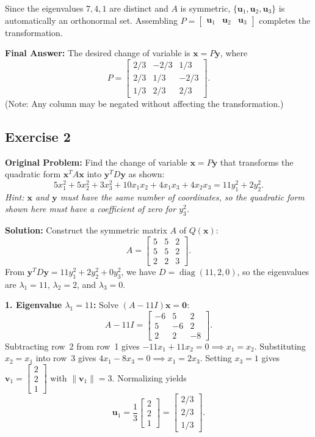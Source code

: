 \documentclass[11pt, letterpaper]{article}
\theoremstyle{definition}
\theoremstyle{remark}
\begin{document}
Since the eigenvalues $7, 4, 1$ are distinct and $A$ is symmetric, $\{\mathbf{u}_1, \mathbf{u}_2, \mathbf{u}_3\}$ is automatically an orthonormal set. Assembling $P = \begin{bmatrix} \mathbf{u}_1 & \mathbf{u}_2 & \mathbf{u}_3 \end{bmatrix}$ completes the transformation.

\textbf{Final Answer:} The desired change of variable is $\mathbf{x} = P\mathbf{y}$, where
\[
P = \begin{bmatrix} 2/3 & -2/3 & 1/3 \\ 2/3 & 1/3 & -2/3 \\ 1/3 & 2/3 & 2/3 \end{bmatrix}.
\]
(Note: Any column may be negated without affecting the transformation.)

\subsection{Exercise 2}
\textbf{Original Problem:} Find the change of variable $\mathbf{x} = P\mathbf{y}$ that transforms the quadratic form $\mathbf{x}^T A \mathbf{x}$ into $\mathbf{y}^T D \mathbf{y}$ as shown:
\[
5x_1^2 + 5x_2^2 + 3x_3^2 + 10x_1x_2 + 4x_1x_3 + 4x_2x_3 = 11y_1^2 + 2y_2^2.
\]
\emph{Hint: $\mathbf{x}$ and $\mathbf{y}$ must have the same number of coordinates, so the quadratic form shown here must have a coefficient of zero for $y_3^2$.}

\textbf{Solution:}
Construct the symmetric matrix $A$ of $Q(\mathbf{x})$:
\[
A = \begin{bmatrix} 5 & 5 & 2 \\ 5 & 5 & 2 \\ 2 & 2 & 3 \end{bmatrix}.
\]
From $\mathbf{y}^T D \mathbf{y} = 11y_1^2 + 2y_2^2 + 0y_3^2$, we have $D = \operatorname{diag}(11, 2, 0)$, so the eigenvalues are $\lambda_1 = 11$, $\lambda_2 = 2$, and $\lambda_3 = 0$.

\textbf{1. Eigenvalue $\lambda_1 = 11$:}
Solve $(A - 11I)\mathbf{x} = \mathbf{0}$:
\[
A - 11I = \begin{bmatrix} -6 & 5 & 2 \\ 5 & -6 & 2 \\ 2 & 2 & -8 \end{bmatrix}.
\]
Subtracting row~2 from row~1 gives $-11x_1 + 11x_2 = 0 \implies x_1 = x_2$. Substituting $x_2 = x_1$ into row~3 gives $4x_1 - 8x_3 = 0 \implies x_1 = 2x_3$. Setting $x_3 = 1$ gives $\mathbf{v}_1 = \begin{bmatrix} 2 \\ 2 \\ 1 \end{bmatrix}$ with $\|\mathbf{v}_1\| = 3$. Normalizing yields
\[
\mathbf{u}_1 = \frac{1}{3}\begin{bmatrix} 2 \\ 2 \\ 1 \end{bmatrix} = \begin{bmatrix} 2/3 \\ 2/3 \\ 1/3 \end{bmatrix}.
\]
\end{document}
